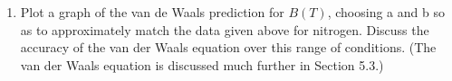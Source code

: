 \documentclass[fleqn]{article}
\begin{document}
\begin{enumerate}
\begin{enumerate}
        \textcolor{hwColor}{
          \\
          $
            \bigg(P+\dfrac{an^2}{V^2}\bigg) \bigg(V-nb\bigg)=nRT
            \\
            \\
            PV+\dfrac{an^2}{V}=n\dfrac{RT}{1-\dfrac{nb}{V}} 
            \\
            \\
            PV=nRT \left[\dfrac{1}{1-\dfrac{nb}{V}}-\dfrac{an}{VRT}\right]
            \\
            \\
            PV=nRT \left[\dfrac{1}{1-\dfrac{nb}{V}}-\dfrac{an}{(V/n)RT}\right]
            \\
            \\
            PV=nRT \left[1+\dfrac{nb}{V}+\bigg( \dfrac{nb}{V} \bigg)^2-\dfrac{an}{(V/n)RT}\right]
            \\
            \\
            \\
            \therefore ~~~ \boxed{
              PV=nRT \left[
                1+\dfrac{1}{V/n} \bigg( b-\dfrac{a}{RT}\bigg)+\dfrac{b^2}{(V/n)^2}
              \right]=nRT \left[
                1+\dfrac{B}{\bigg( \dfrac{V}{n} \bigg)}+\dfrac{C}{\bigg( \dfrac{V}{n} \bigg)^2}
              \right]
            } ~~~~ \checkmark
            \\
            \\
            \\
            \Longrightarrow \boxed{
              \begin{cases}
                B=b-\dfrac{a}{RT}
                \\
                \\
                C=b^2
              \end{cases}
            } ~~~~ \checkmark
          $
        }

      \item Plot a graph of the van de Waals prediction for $B(T)$, choosing a and b so as to approximately match the data given above for nitrogen. 
      Discuss the accuracy of the van der Waals equation over this range of conditions. (The van der Waals equation is discussed much further 
      in Section 5.3.)


\end{enumerate}
\end{enumerate}
\end{document}
